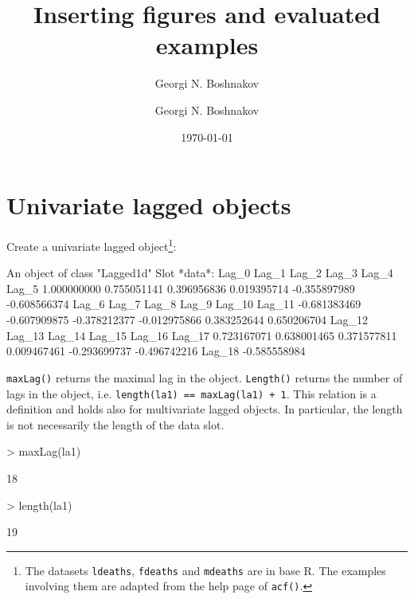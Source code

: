 \documentclass[a4paper,twoside,11pt,nojss,article]{jss}
\author{Georgi N. Boshnakov}
\author{Georgi N. Boshnakov}
\date{\today}
\title{Inserting figures and evaluated examples}
\begin{document}
\maketitle



\section{Univariate lagged objects}
\label{sec:org2fecd57}

Create a univariate lagged object\footnote{The datasets \texttt{ldeaths}, \texttt{fdeaths} and \texttt{mdeaths} are in base R. The examples
involving them are adapted from the help page of \texttt{acf()}.}:
\begin{Schunk}
\begin{Soutput}
An object of class "Lagged1d"
Slot *data*: 
       Lag_0        Lag_1        Lag_2        Lag_3        Lag_4        Lag_5 
 1.000000000  0.755051141  0.396956836  0.019395714 -0.355897989 -0.608566374 
       Lag_6        Lag_7        Lag_8        Lag_9       Lag_10       Lag_11 
-0.681383469 -0.607909875 -0.378212377 -0.012975866  0.383252644  0.650206704 
      Lag_12       Lag_13       Lag_14       Lag_15       Lag_16       Lag_17 
 0.723167071  0.638001465  0.371577811  0.009467461 -0.293699737 -0.496742216 
      Lag_18 
-0.585558984 
\end{Soutput}
\end{Schunk}


\texttt{maxLag()} returns the maximal lag in the object. \texttt{Length()} returns the number of lags in the
object, i.e. \texttt{length(la1) == maxLag(la1) + 1}. This relation is a definition and holds also
for multivariate lagged objects. In particular, the length is not necessarily the
length of the data slot.
\begin{Schunk}
\begin{Sinput}
> maxLag(la1)
\end{Sinput}
\begin{Soutput}
[1] 18
\end{Soutput}
\begin{Sinput}
> length(la1)
\end{Sinput}
\begin{Soutput}
[1] 19
\end{Soutput}
\end{Schunk}
\end{document}
